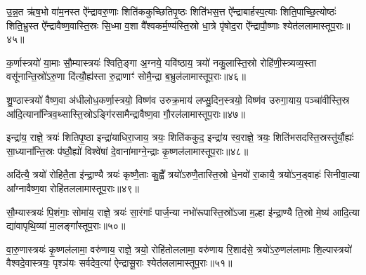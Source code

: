 {\anuvakamend[{॥13॥}]}

उ॒न्न॒त ऋ॑ष॒भो वा॑म॒नस्त ऐ᳚न्द्रावरु॒णाः शिति॑ककुच्छितिपृ॒ष्ठः शिति॑भस॒त्त ऐ᳚न्द्राबार्\mbox{}हस्प॒त्याः शिति॒पाच्छि॒त्योष्ठः॑ शिति॒भ्रुस्त ऐ᳚न्द्रावैष्ण॒वास्ति॒स्रः सि॒ध्मा व॒शा वै᳚श्वकर्म॒ण्य॑स्ति॒स्रो धा॒त्रे पृ॑षोद॒रा ऐ᳚न्द्रापौ॒ष्णाः श्येत॑ललामास्तूप॒राः॥४५॥

{}

क॒र्णास्त्रयो॑ या॒माः सौ॒म्यास्त्रयः॑ श्विति॒ङ्गा अ॒ग्नये॒ यवि॑ष्ठाय॒ त्रयो॑ नकु॒लास्ति॒स्रो रोहि॑णी॒स्त्र्यव्य॒स्ता वसू॑नान्ति॒स्रो॑\-ऽरु॒णा दि॑त्यौ॒ह्य॑स्ता रु॒द्राणाꣳ॑ सोमै॒न्द्रा ब॒भ्रुल॑लामास्तूप॒राः॥४६॥

{\anuvakamend[{क॒र्णास्त्रयो॑विꣳशतिः॥15॥}]}

शु॒ण्ठास्त्रयो॑ वैष्ण॒वा अ॑धीलोध॒कर्णा॒स्त्रयो॒ विष्ण॑व उरुक्र॒माय॑ लप्सु॒दिन॒स्त्रयो॒ विष्ण॑व उरुगा॒याय॒ पञ्चा॑वीस्ति॒स्र आ॑दि॒त्याना᳚न्त्रिव॒थ्सास्ति॒स्रो\-ऽङ्गि॑रसामैन्द्रावैष्ण॒वा गौ॒रल॑लामास्तूप॒राः॥४७॥

{\anuvakamend[{शु॒ण्ठा विꣳ॑श॒तिः॥16॥}]}

इन्द्रा॑य॒ राज्ञे॒ त्रयः॑ शितिपृ॒ष्ठा इन्द्रा॑याधिरा॒जाय॒ त्रयः॒ शिति॑ककुद॒ इन्द्रा॑य स्व॒राज्ञे॒ त्रयः॒ शिति॑भसदस्ति॒स्रस्तु॑र्यौ॒ह्यः॑ सा॒ध्याना᳚न्ति॒स्रः प॑ष्ठौ॒ह्यो॑ विश्वे॑षां दे॒वाना॑माग्ने॒न्द्राः कृ॒ष्णल॑लामास्तूप॒राः॥४८॥

{\anuvakamend[{इन्द्रा॑य॒ राज्ञे॒ द्वाविꣳ॑शतिः॥17॥}]}

अदि॑त्यै॒ त्रयो॑ रोहितै॒ता इ॑न्द्रा॒ण्यै त्रयः॑ कृष्णै॒ताः कु॒ह्वै᳚ त्रयो॑\-ऽरुणै॒तास्ति॒स्रो धे॒नवो॑ रा॒कायै॒ त्रयो॑\-ऽन॒ड्वाहः॑ सिनीवा॒ल्या आ᳚ग्नावैष्ण॒वा रोहि॑तललामास्तूप॒राः॥४९॥

{\anuvakamend[{अदि॑त्या अ॒ष्टाद॑श॥18॥}]}

सौ॒म्यास्त्रयः॑ पि॒शंगाः॒ सोमा॑य॒ राज्ञे॒ त्रयः॑ सा॒रंगाः᳚ पार्ज॒न्या नभो॑रूपास्ति॒स्रो॑\-ऽजा म॒ल्\mbox{}हा इ॑न्द्रा॒ण्यै ति॒स्रो मे॒ष्य॑ आदि॒त्या द्या॑वापृथि॒व्या॑ मा॒लङ्गा᳚स्तूप॒राः॥५०॥

{\anuvakamend[{सौ॒म्या एका॒न्नविꣳ॑शतिः॥19॥}]}

वा॒रु॒णास्त्रयः॑ कृ॒ष्णल॑लामा॒ वरु॑णाय॒ राज्ञे॒ त्रयो॒ रोहि॑तोललामा॒ वरु॑णाय रि॒शाद॑से॒ त्रयो॑\-ऽरु॒णल॑लामाः शि॒ल्पास्त्रयो॑ वैश्वदे॒वास्त्रयः॒ पृश्ञ॑यः सर्वदेव॒त्या॑ ऐन्द्रासू॒राः श्येत॑ललामास्तूप॒राः॥५१॥

{\anuvakamend[{वा॒रु॒णा विꣳ॑श॒तिः॥20॥}]}

